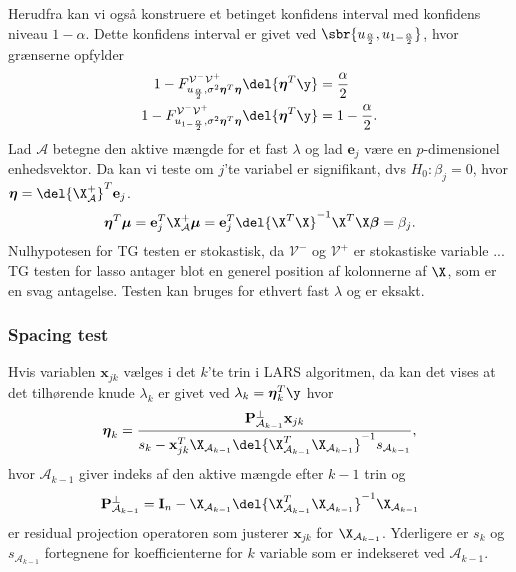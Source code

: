 Herudfra kan vi også konstruere et betinget konfidens interval med konfidens niveau \(1-\alpha\).
Dette konfidens interval er givet ved \(\sbr{u_{\frac{\alpha}{2}}, u_{1-\frac{\alpha}{2}}}\), hvor grænserne opfylder
\begin{align*}
1-F_{u_{\frac{\alpha}{2}}, \sigma^2 \boldsymbol{\eta}^T  \boldsymbol{\eta} }^{\mathcal{V}^- \mathcal{V}^+} \del{\boldsymbol{\eta}^T \y} &= \frac{\alpha}{2} \\
1-F_{u_{1-\frac{\alpha}{2}}, \sigma^2 \boldsymbol{\eta}^T  \boldsymbol{\eta} }^{\mathcal{V}^- \mathcal{V}^+} \del{\boldsymbol{\eta}^T \y} &= 1-\frac{\alpha}{2}.
\end{align*}
Lad \(\mathcal{A}\) betegne den aktive mængde for et fast \(\lambda\) og lad \(\mathbf{e}_j\) være en \(p\)-dimensionel enhedsvektor.
Da kan vi teste om \(j\)'te variabel er signifikant, dvs \(H_0: \beta_j =0\), hvor \(\boldsymbol{\eta}=\del{\X_\mathcal{A}^+}^T \mathbf{e}_j\).
\begin{align*}
\boldsymbol{\eta}^T \boldsymbol{\mu} = \mathbf{e}_j^T \X_\mathcal{A}^+ \boldsymbol{\mu} = \mathbf{e}_j^T \del{\X^T \X}^{-1} \X^T \X \boldsymbol{\beta} = \beta_j.
\end{align*}
Nulhypotesen for TG testen er stokastisk, da \(\mathcal{V}^-\) og \(\mathcal{V}^+\) er stokastiske variable ...
TG testen for lasso antager blot en generel position af kolonnerne af \(\X\), som er en svag antagelse.
Testen kan bruges for ethvert fast \(\lambda\) og er eksakt.
%
\subsubsection{Spacing test}
Hvis variablen \(\mathbf{x}_{jk}\) vælges i det \(k\)'te trin i LARS algoritmen, da kan det vises at det tilhørende knude \(\lambda_k\) er givet ved \(\lambda_k = \boldsymbol{\eta}_k^T \y\) hvor
\begin{align*}
\boldsymbol{\eta}_k = \frac{\mathbf{P}^\perp_{\mathcal{A}_{k-1}} \mathbf{x}_{jk}}{s_k - \mathbf{x}_{jk}^T \X_{\mathcal{A}_{k-1}} \del{\X_{\mathcal{A}_{k-1}}^T \X_{\mathcal{A}_{k-1}}}^{-1} s_{\mathcal{A}_{k-1}}},
\end{align*}
hvor \(\mathcal{A}_{k-1}\) giver indeks af den aktive mængde efter \(k-1\) trin og
\begin{align*}
\mathbf{P}^\perp_{\mathcal{A}_{k-1}} = \mathbf{I}_n - \X_{\mathcal{A}_{k-1}} \del{\X_{\mathcal{A}_{k-1}}^T \X_{\mathcal{A}_{k-1}}}^{-1} \X _{\mathcal{A}_{k-1}}
\end{align*}
er residual projection operatoren som justerer \(\mathbf{x}_{jk}\) for \(\X_{\mathcal{A}_{k-1}}\).
Yderligere er \(s_k\) og \(s_{\mathcal{A}_{k-1}}\) fortegnene for koefficienterne for \(k\) variable som er indekseret ved \(\mathcal{A}_{k-1}\).

